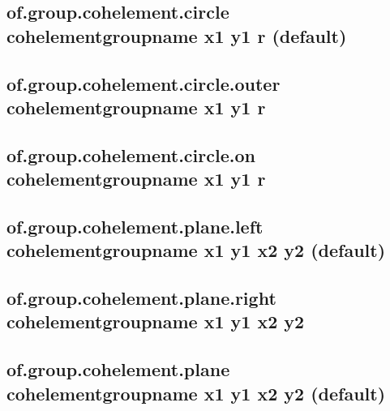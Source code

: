 \documentclass[letterpaper,10pt,english]{sphinxmanual}
\begin{document}
\subsection{of.group.cohelement.circle cohelementgroupname x1 y1 r (default)}
\label{\detokenize{rst_tutorials/command_line_guide:of-group-cohelement-circle-cohelementgroupname-x1-y1-r-default}}

\subsection{of.group.cohelement.circle.outer cohelementgroupname x1 y1 r}
\label{\detokenize{rst_tutorials/command_line_guide:of-group-cohelement-circle-outer-cohelementgroupname-x1-y1-r}}\label{\detokenize{rst_tutorials/command_line_guide:section-2}}

\subsection{of.group.cohelement.circle.on cohelementgroupname x1 y1 r}
\label{\detokenize{rst_tutorials/command_line_guide:of-group-cohelement-circle-on-cohelementgroupname-x1-y1-r}}\label{\detokenize{rst_tutorials/command_line_guide:section-3}}

\subsection{of.group.cohelement.plane.left cohelementgroupname x1 y1 x2 y2 (default)}
\label{\detokenize{rst_tutorials/command_line_guide:of-group-cohelement-plane-left-cohelementgroupname-x1-y1-x2-y2-default}}\label{\detokenize{rst_tutorials/command_line_guide:section-4}}

\subsection{of.group.cohelement.plane.right cohelementgroupname x1 y1 x2 y2}
\label{\detokenize{rst_tutorials/command_line_guide:of-group-cohelement-plane-right-cohelementgroupname-x1-y1-x2-y2}}\label{\detokenize{rst_tutorials/command_line_guide:section-5}}

\subsection{of.group.cohelement.plane cohelementgroupname x1 y1 x2 y2 (default)}
\label{\detokenize{rst_tutorials/command_line_guide:of-group-cohelement-plane-cohelementgroupname-x1-y1-x2-y2-default}}\label{\detokenize{rst_tutorials/command_line_guide:section-6}}
\end{document}
